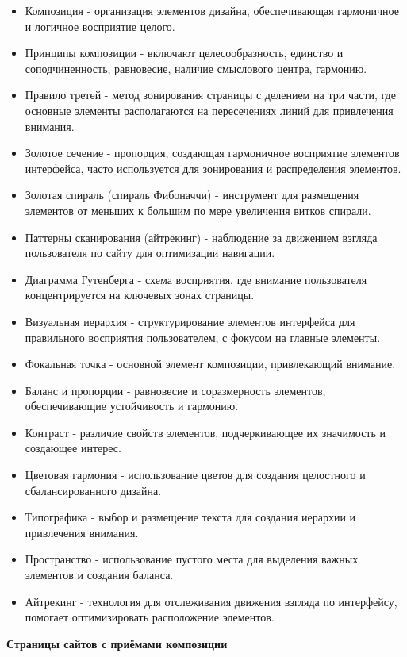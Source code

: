 \begin{itemize}
    \item Композиция - организация элементов дизайна, обеспечивающая гармоничное и логичное восприятие целого.
    \item Принципы композиции - включают целесообразность, единство и соподчиненность, равновесие, наличие смыслового центра, гармонию.
    \item Правило третей - метод зонирования страницы с делением на три части, где основные элементы располагаются на пересечениях линий для привлечения внимания.
    \item Золотое сечение - пропорция, создающая гармоничное восприятие элементов интерфейса, часто используется для зонирования и распределения элементов.
    \item Золотая спираль (спираль Фибоначчи) - инструмент для размещения элементов от меньших к большим по мере увеличения витков спирали.
    \item Паттерны сканирования (айтрекинг) - наблюдение за движением взгляда пользователя по сайту для оптимизации навигации.
    \item Диаграмма Гутенберга - схема восприятия, где внимание пользователя концентрируется на ключевых зонах страницы.
    \item Визуальная иерархия - структурирование элементов интерфейса для правильного восприятия пользователем, с фокусом на главные элементы.
    \item Фокальная точка - основной элемент композиции, привлекающий внимание.
    \item Баланс и пропорции - равновесие и соразмерность элементов, обеспечивающие устойчивость и гармонию.
    \item Контраст - различие свойств элементов, подчеркивающее их значимость и создающее интерес.
    \item Цветовая гармония - использование цветов для создания целостного и сбалансированного дизайна.
    \item Типографика - выбор и размещение текста для создания иерархии и привлечения внимания.
    \item Пространство - использование пустого места для выделения важных элементов и создания баланса.
    \item Айтрекинг - технология для отслеживания движения взгляда по интерфейсу, помогает оптимизировать расположение элементов.
\end{itemize}
\bigskip

\textbf{Страницы сайтов с приёмами композиции}
\bigskip

